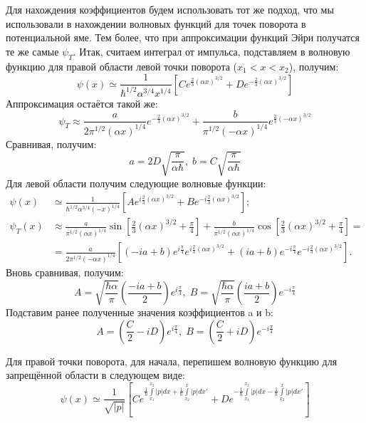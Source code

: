 Для нахождения коэффициентов будем использовать тот же подход, что мы использовали в нахождении волновых функций для точек поворота в потенциальной яме. Тем более, что при аппроксимации функций Эйри получатся те же самые $\psi_T$. Итак, считаем интеграл от импульса, подставляем в волновую функцию для правой области левой точки поворота ($x_1 < x < x_2$), получим:
\[
    \psi(x) \simeq \frac{1}{\hbar^{1/2}\alpha^{3/4}x^{1/4}}\left[ Ce^{\frac{2}{3}(\alpha x)^{3/2}} + De^{-\frac{2}{3}(\alpha x)^{3/2}} \right]
\]
Аппроксимация остаётся такой же:
\[
    \psi_T \approx \frac{a}{2\pi^{1/2}(\alpha x)^{1/4}}e^{-\frac{2}{3}(\alpha x)^{3/2}} + \frac{b}{\pi^{1/2}(-\alpha x)^{1/4}}e^{\frac{2}{3}(-\alpha x)^{3/2}}
\]
Сравнивая, получим:
\[
a = 2D\sqrt{\frac{\pi}{\alpha\hbar}},\; b = C\sqrt{\frac{\pi}{\alpha\hbar}}
\]
Для левой области получим следующие волновые функции:
\begin{align*}
    \psi(x) &\simeq \frac{1}{\hbar^{1/2}\alpha^{3/4}(-x)^{1/4}}\left[ Ae^{i\frac{2}{3}(\alpha x)^{3/2}} + Be^{-i\frac{2}{3}(\alpha x)^{3/2}} \right];\\
    \psi_T(x) &\approx \frac{a}{\pi^{1/2}(\alpha x)^{1/4}}\sin\left[\frac{2}{3}(\alpha x)^{3/2} + \frac{\pi}{4}\right] + \frac{b}{\pi^{1/2}(\alpha x)^{1/4}}\cos\left[\frac{2}{3}(\alpha x)^{3/2} + \frac{\pi}{4}\right] = \\ 
    & = \frac{a}{2\pi^{1/2}(-\alpha x)^{1/4}}\left[ (-ia + b)e^{i\frac{\pi}{4}}e^{i\frac{2}{3}(\alpha x)^{3/2}} + (ia+b)e^{-i\frac{\pi}{4}}e^{-i\frac{2}{3}(\alpha x)^{3/2}} \right].
\end{align*}
Вновь сравнивая, получим:
\[
A = \sqrt{\frac{\hbar\alpha}{\pi}}\left( \frac{-ia + b}{2} \right)e^{i\frac{\pi}{4}},\; B = \sqrt{\frac{\hbar\alpha}{\pi}}\left( \frac{ia + b}{2} \right)e^{-i\frac{\pi}{4}}
\]
Подставим ранее полученные значения коэффициентов a и b:
\[
    A = \left( \frac{C}{2} - iD \right)e^{i\frac{\pi}{4}}, \; B = \left( \frac{C}{2} + iD \right)e^{-i\frac{\pi}{4}}
\]

Для правой точки поворота, для начала, перепишем волновую функцию для запрещённой области в следующем виде:
\[
\psi(x) \simeq \frac{1}{\sqrt{|p|}} \left[ Ce^{\frac{1}{\hbar}\int\limits_{x_1}^{x_2} |p| dx + \frac{1}{\hbar}\int\limits_{x_2}^{x} |p| dx'} + De^{-\frac{1}{\hbar}\int\limits_{x_1}^{x_2} |p| dx - \frac{1}{\hbar}\int\limits_{x_2}^{x} |p| dx'} \right]
\]

